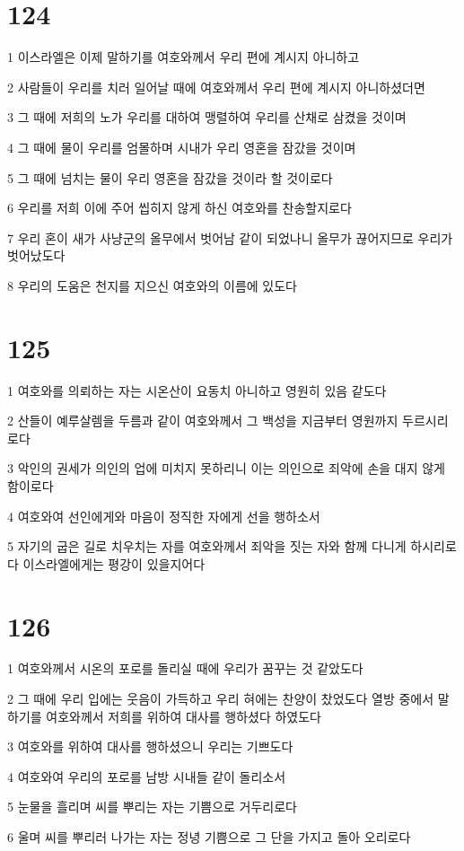 \chapter{124}

\par 1 이스라엘은 이제 말하기를 여호와께서 우리 편에 계시지 아니하고
\par 2 사람들이 우리를 치러 일어날 때에 여호와께서 우리 편에 계시지 아니하셨더면
\par 3 그 때에 저희의 노가 우리를 대하여 맹렬하여 우리를 산채로 삼켰을 것이며
\par 4 그 때에 물이 우리를 엄몰하며 시내가 우리 영혼을 잠갔을 것이며
\par 5 그 때에 넘치는 물이 우리 영혼을 잠갔을 것이라 할 것이로다
\par 6 우리를 저희 이에 주어 씹히지 않게 하신 여호와를 찬송할지로다
\par 7 우리 혼이 새가 사냥군의 올무에서 벗어남 같이 되었나니 올무가 끊어지므로 우리가 벗어났도다
\par 8 우리의 도움은 천지를 지으신 여호와의 이름에 있도다

\chapter{125}

\par 1 여호와를 의뢰하는 자는 시온산이 요동치 아니하고 영원히 있음 같도다
\par 2 산들이 예루살렘을 두름과 같이 여호와께서 그 백성을 지금부터 영원까지 두르시리로다
\par 3 악인의 권세가 의인의 업에 미치지 못하리니 이는 의인으로 죄악에 손을 대지 않게 함이로다
\par 4 여호와여 선인에게와 마음이 정직한 자에게 선을 행하소서
\par 5 자기의 굽은 길로 치우치는 자를 여호와께서 죄악을 짓는 자와 함께 다니게 하시리로다 이스라엘에게는 평강이 있을지어다

\chapter{126}

\par 1 여호와께서 시온의 포로를 돌리실 때에 우리가 꿈꾸는 것 같았도다
\par 2 그 때에 우리 입에는 웃음이 가득하고 우리 혀에는 찬양이 찼었도다 열방 중에서 말하기를 여호와께서 저희를 위하여 대사를 행하셨다 하였도다
\par 3 여호와를 위하여 대사를 행하셨으니 우리는 기쁘도다
\par 4 여호와여 우리의 포로를 남방 시내들 같이 돌리소서
\par 5 눈물을 흘리며 씨를 뿌리는 자는 기쁨으로 거두리로다
\par 6 울며 씨를 뿌리러 나가는 자는 정녕 기쁨으로 그 단을 가지고 돌아 오리로다

